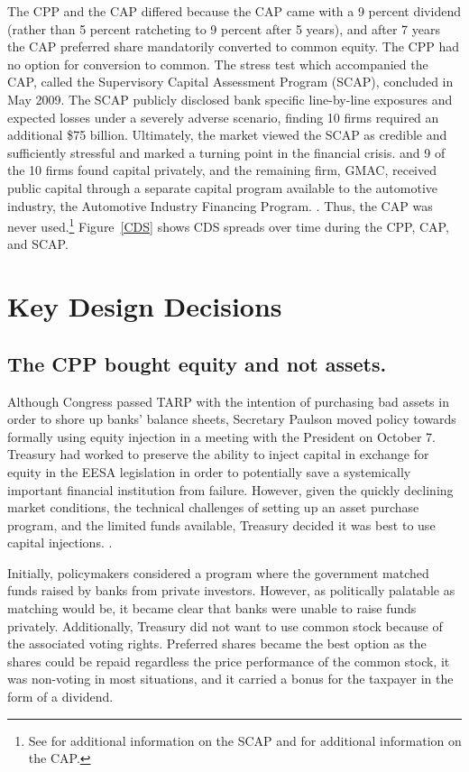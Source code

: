 \documentclass[12pt]{article}
\begin{document}
The CPP and the CAP differed because the CAP came with a 9 percent dividend (rather than 5 percent ratcheting to 9 percent after 5 years), and after 7 years the CAP preferred share mandatorily converted to common equity. The CPP had no option for conversion to common. The stress test which accompanied the CAP, called the Supervisory Capital Assessment Program (SCAP), concluded in May 2009. The SCAP publicly disclosed bank specific line-by-line exposures and expected losses under a severely adverse scenario, finding 10 firms required an additional \$75 billion. Ultimately, the market viewed the SCAP as credible and sufficiently stressful and marked a turning point in the financial crisis. \citep{Bernanke} and \citep{Geithner} 9 of the 10 firms found capital privately, and the remaining firm, GMAC, received public capital through a separate capital program available to the automotive industry, the Automotive Industry Financing Program. \citep{Ross2016a}. Thus, the CAP was never used.\footnote{See \citet{Ross2016a} for additional information on the SCAP and \citet{Ross2016b} for additional information on the CAP.} Figure~\ref{CDS} shows CDS spreads over time during the CPP, CAP, and SCAP.

\newpage
\section{Key Design Decisions}

\subsection{The CPP bought equity and not assets.}

Although Congress passed TARP with the intention of purchasing bad assets in order to shore up banks' balance sheets, Secretary Paulson moved policy towards formally using equity injection in a meeting with the President on October 7. Treasury had worked to preserve the ability to inject capital in exchange for equity in the EESA legislation in order to potentially save a systemically important financial institution from failure. However, given the quickly declining market conditions, the technical challenges of setting up an asset purchase program, and the limited funds available, Treasury decided it was best to use capital injections. \citep{paulsonbook}.

Initially, policymakers considered a program where the government matched funds raised by banks from private investors. However, as politically palatable as matching would be, it became clear that banks were unable to raise funds privately. Additionally, Treasury did not want to use common stock because of the associated voting rights. Preferred shares became the best option as the shares could be repaid regardless the price performance of the common stock, it was non-voting in most situations, and it carried a bonus for the taxpayer in the form of a dividend.
\end{document}
